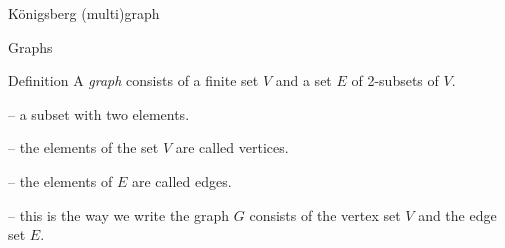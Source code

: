 \documentclass{beamer}
\begin{document}
  \begin{frame}{K{\"o}nigsberg (multi)graph}
    \vspace{10mm}
    \begin{adjustbox}{max width={0.9\textwidth},center} 
    \end{adjustbox}
  \end{frame}
  
  \begin{frame}{Graphs}
    \begin{alertblock}{Definition}
    A \emph{graph} consists of a finite set $V$ and a set $E$ of 2-subsets of $V$.
    \end{alertblock}
    \vspace{4mm}
    \begin{description}
      \setlength\itemsep{3mm}
      \item[$2$-subset] -- a subset with two elements.
      \item[Vertices] -- the elements of the set $V$ are called vertices.
      \item[Edges] -- the elements of $E$ are called edges.
      \item[$G = (V,E)$] -- this is the way we write the graph $G$ consists of the vertex set $V$ and the edge set $E$.
    \end{description}
  \end{frame}
  
\end{document}
